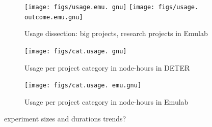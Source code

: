 \documentclass[10pt, twocolumn]{article} %
\begin{document}
\begin{figure}[htbp] \begin{center}
\texttt{[image: figs/usage.emu.
gnu]}
\texttt{[image: figs/usage.
outcome.emu.gnu]} \caption{Usage dissection: big projects, research
projects in Emulab} \label{usagedise} \end{center} \end{figure}


\begin{figure}[htbp] \begin{center}
\texttt{[image: figs/cat.usage.
gnu]} \caption{Usage per project category in node-hours in DETER}
\label{catusage} \end{center} \end{figure}

\begin{figure}[htbp] \begin{center}
\texttt{[image: figs/cat.usage.
emu.gnu]} \caption{Usage per project category in node-hours in Emulab}
\label{catusage} \end{center} \end{figure}


experiment sizes and durations trends?






\end{document}
